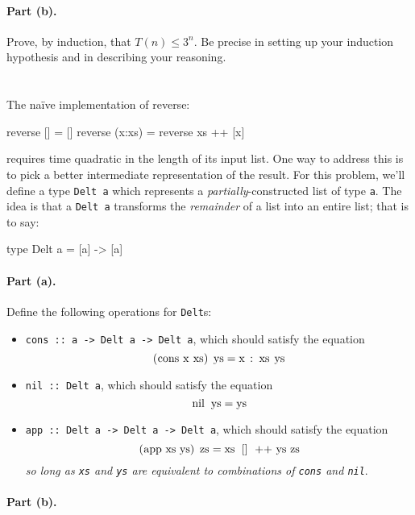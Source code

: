 \documentclass{article}
\newcommand{\Problem}[1][]{\ifthenelse{\equal{#1}{}}{}{\addtocounter{section}{#1}}\clearpage\section{}\setcounter{page}{1}}
\begin{document}
\paragraph{Part (b).} Prove, by induction, that $T(n) \leq 3^n$.  Be precise in setting up your induction hypothesis and in describing your reasoning.

\Problem

The na\"ive implementation of reverse:
\begin{code}
reverse []     = []
reverse (x:xs) = reverse xs ++ [x]
\end{code}
requires time quadratic in the length of its input list.  One way to address this is to pick a better intermediate representation of the result.  For this problem, we'll define a type \lstinline!Delt a! which represents a \emph{partially}-constructed list of type \lstinline!a!.  The idea is that a \lstinline!Delt a! transforms the \emph{remainder} of a list into an entire list; that is to say:
\begin{code}
type Delt a = [a] -> [a]
\end{code}

\paragraph{Part (a).}

Define the following operations for \lstinline|Delt|s:
\begin{itemize}

\item \lstinline|cons :: a -> Delt a -> Delt a|, which should satisfy the equation
  \[
    \mbox{\lstinline|(cons x xs) ys|} = \mbox{\lstinline|x : xs ys|}
  \]

\item \lstinline|nil :: Delt a|, which should satisfy the equation
  \[
    \mbox{\lstinline|nil ys|} = \mbox{\lstinline|ys|}
  \]

\item \lstinline|app :: Delt a -> Delt a -> Delt a|, which should satisfy the equation
  \[
    \mbox{\lstinline|(app xs ys) zs|} = \mbox{\lstinline|xs [] ++ ys zs|}
  \]
  \emph{so long as \lstinline|xs| and \lstinline|ys| are \emph{equivalent to} combinations of \lstinline|cons| and \lstinline|nil|}.
\end{itemize}

\paragraph{Part (b).}
\end{document}
